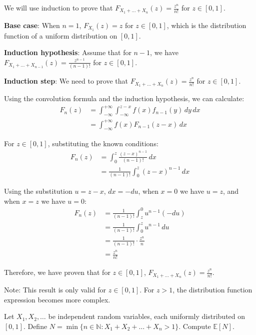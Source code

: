     \begin{solution}
        We will use induction to prove that $F_{X_1+\ldots+X_n}(z) = \frac{z^n}{n!}$ for $z \in [0,1]$.

\textbf{Base case}: When $n=1$, $F_{X_1}(z) = z$ for $z \in [0,1]$, which is the distribution function of a uniform distribution on $[0,1]$.

\textbf{Induction hypothesis}: Assume that for $n-1$, we have $F_{X_1+\ldots+X_{n-1}}(z) = \frac{z^{n-1}}{(n-1)!}$ for $z \in [0,1]$.

\textbf{Induction step}: We need to prove that $F_{X_1+\ldots+X_n}(z) = \frac{z^n}{n!}$ for $z \in [0,1]$.

Using the convolution formula and the induction hypothesis, we can calculate:
\begin{align*}
F_n(z) &= \int_{-\infty}^{+\infty}\int_{-\infty}^{z-x} f(x)f_{n-1}(y) \, dy \, dx\\
&= \int_{-\infty}^{+\infty} f(x)F_{n-1}(z-x) \, dx
\end{align*}

For $z \in [0,1]$, substituting the known conditions:
\begin{align*}
F_n(z) &= \int_{0}^{z} \frac{(z-x)^{n-1}}{(n-1)!} \, dx\\
&= \frac{1}{(n-1)!}\int_{0}^{z} (z-x)^{n-1} \, dx
\end{align*}

Using the substitution $u = z-x$, $dx = -du$, when $x=0$ we have $u=z$, and when $x=z$ we have $u=0$:
\begin{align*}
F_n(z) &= \frac{1}{(n-1)!}\int_{z}^{0} u^{n-1} (-du)\\
&= \frac{1}{(n-1)!}\int_{0}^{z} u^{n-1} \, du\\
&= \frac{1}{(n-1)!} \cdot \frac{z^n}{n}\\
&= \frac{z^n}{n!}
\end{align*}

Therefore, we have proven that for $z \in [0,1]$, $F_{X_1+\ldots+X_n}(z) = \frac{z^n}{n!}$.

Note: This result is only valid for $z \in [0,1]$. For $z > 1$, the distribution function expression becomes more complex.

    \end{solution}
    
    \begin{problem}[]
    Let $X_1, X_2, \ldots$ be independent random variables, each uniformly distributed on $[0,1]$. Define $N = \min\{n \in \mathbb{N}: X_1 + X_2 + \ldots + X_n > 1\}$. Compute $\mathbb{E}[N]$.
    \end{problem}
    
